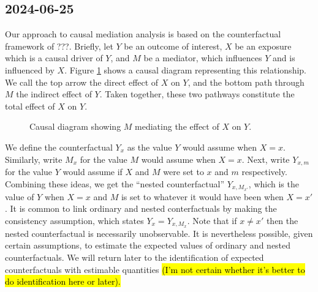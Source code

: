 \documentclass{article}
\begin{document}
\subsection{2024-06-25}

Our approach to causal mediation analysis is based on the counterfactual framework of ???. Briefly, let $Y$ be an outcome of interest, $X$ be an exposure which is a causal driver of $Y$, and $M$ be a mediator, which influences $Y$ and is influenced by $X$. Figure \ref{fig:simp_med} shows a causal diagram representing this relationship. We call the top arrow the direct effect of $X$ on $Y$, and the bottom path through $M$ the indirect effect of $Y$. Taken together, these two pathways constitute the total effect of $X$ on $Y$.

\begin{figure}
    \centering
      \caption{Causal diagram showing $M$ mediating the effect of $X$ on $Y$.}    
      \label{fig:simp_med}
\end{figure}

We define the counterfactual $Y_x$ as the value $Y$ would assume when $X=x$. Similarly, write $M_x$ for the value $M$ would assume when $X=x$. Next, write $Y_{x,m}$ for the value $Y$ would assume if $X$ and $M$ were set to $x$ and $m$ respectively. Combining these ideas, we get the ``nested counterfactual'' $Y_{x, M_{x'}}$, which is the value of $Y$ when $X=x$ and $M$ is set to whatever it would have been when $X=x'$. It is common to link ordinary and nested conterfactuals by making the consistency assumption, which states $Y_x = Y_{x, M_x}$. Note that if $x \neq x'$ then the nested counterfactual is necessarily unobservable. It is nevertheless possible, given certain assumptions, to estimate the expected values of ordinary and nested counterfactuals. We will return later to the identification of expected counterfactuals with estimable quantities \hl{(I'm not certain whether it's better to do identification here or later).}
\end{document}
